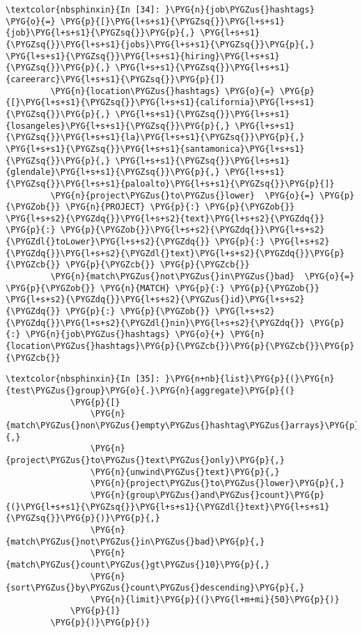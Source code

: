 \documentclass[letterpaper,10pt,english]{sphinxmanual}
\begin{document}
%
\begin{Verbatim}[commandchars=\\\{\}]
\textcolor{nbsphinxin}{In [34]: }\PYG{n}{job\PYGZus{}hashtags}      \PYG{o}{=} \PYG{p}{[}\PYG{l+s+s1}{\PYGZsq{}}\PYG{l+s+s1}{job}\PYG{l+s+s1}{\PYGZsq{}}\PYG{p}{,} \PYG{l+s+s1}{\PYGZsq{}}\PYG{l+s+s1}{jobs}\PYG{l+s+s1}{\PYGZsq{}}\PYG{p}{,} \PYG{l+s+s1}{\PYGZsq{}}\PYG{l+s+s1}{hiring}\PYG{l+s+s1}{\PYGZsq{}}\PYG{p}{,} \PYG{l+s+s1}{\PYGZsq{}}\PYG{l+s+s1}{careerarc}\PYG{l+s+s1}{\PYGZsq{}}\PYG{p}{]}
         \PYG{n}{location\PYGZus{}hashtags} \PYG{o}{=} \PYG{p}{[}\PYG{l+s+s1}{\PYGZsq{}}\PYG{l+s+s1}{california}\PYG{l+s+s1}{\PYGZsq{}}\PYG{p}{,} \PYG{l+s+s1}{\PYGZsq{}}\PYG{l+s+s1}{losangeles}\PYG{l+s+s1}{\PYGZsq{}}\PYG{p}{,} \PYG{l+s+s1}{\PYGZsq{}}\PYG{l+s+s1}{la}\PYG{l+s+s1}{\PYGZsq{}}\PYG{p}{,} \PYG{l+s+s1}{\PYGZsq{}}\PYG{l+s+s1}{santamonica}\PYG{l+s+s1}{\PYGZsq{}}\PYG{p}{,} \PYG{l+s+s1}{\PYGZsq{}}\PYG{l+s+s1}{glendale}\PYG{l+s+s1}{\PYGZsq{}}\PYG{p}{,} \PYG{l+s+s1}{\PYGZsq{}}\PYG{l+s+s1}{paloalto}\PYG{l+s+s1}{\PYGZsq{}}\PYG{p}{]}
         \PYG{n}{project\PYGZus{}to\PYGZus{}lower}  \PYG{o}{=} \PYG{p}{\PYGZob{}} \PYG{n}{PROJECT} \PYG{p}{:} \PYG{p}{\PYGZob{}} \PYG{l+s+s2}{\PYGZdq{}}\PYG{l+s+s2}{text}\PYG{l+s+s2}{\PYGZdq{}} \PYG{p}{:} \PYG{p}{\PYGZob{}}\PYG{l+s+s2}{\PYGZdq{}}\PYG{l+s+s2}{\PYGZdl{}toLower}\PYG{l+s+s2}{\PYGZdq{}} \PYG{p}{:} \PYG{l+s+s2}{\PYGZdq{}}\PYG{l+s+s2}{\PYGZdl{}text}\PYG{l+s+s2}{\PYGZdq{}}\PYG{p}{\PYGZcb{}} \PYG{p}{\PYGZcb{}} \PYG{p}{\PYGZcb{}}
         \PYG{n}{match\PYGZus{}not\PYGZus{}in\PYGZus{}bad}  \PYG{o}{=} \PYG{p}{\PYGZob{}} \PYG{n}{MATCH} \PYG{p}{:} \PYG{p}{\PYGZob{}} \PYG{l+s+s2}{\PYGZdq{}}\PYG{l+s+s2}{\PYGZus{}id}\PYG{l+s+s2}{\PYGZdq{}} \PYG{p}{:} \PYG{p}{\PYGZob{}} \PYG{l+s+s2}{\PYGZdq{}}\PYG{l+s+s2}{\PYGZdl{}nin}\PYG{l+s+s2}{\PYGZdq{}} \PYG{p}{:} \PYG{n}{job\PYGZus{}hashtags} \PYG{o}{+} \PYG{n}{location\PYGZus{}hashtags}\PYG{p}{\PYGZcb{}}\PYG{p}{\PYGZcb{}}\PYG{p}{\PYGZcb{}}
\end{Verbatim}

%
\begin{Verbatim}[commandchars=\\\{\}]
\textcolor{nbsphinxin}{In [35]: }\PYG{n+nb}{list}\PYG{p}{(}\PYG{n}{test\PYGZus{}group}\PYG{o}{.}\PYG{n}{aggregate}\PYG{p}{(}
             \PYG{p}{[}
                 \PYG{n}{match\PYGZus{}non\PYGZus{}empty\PYGZus{}hashtag\PYGZus{}arrays}\PYG{p}{,}
                 \PYG{n}{project\PYGZus{}to\PYGZus{}text\PYGZus{}only}\PYG{p}{,}
                 \PYG{n}{unwind\PYGZus{}text}\PYG{p}{,}
                 \PYG{n}{project\PYGZus{}to\PYGZus{}lower}\PYG{p}{,}
                 \PYG{n}{group\PYGZus{}and\PYGZus{}count}\PYG{p}{(}\PYG{l+s+s1}{\PYGZsq{}}\PYG{l+s+s1}{\PYGZdl{}text}\PYG{l+s+s1}{\PYGZsq{}}\PYG{p}{)}\PYG{p}{,}
                 \PYG{n}{match\PYGZus{}not\PYGZus{}in\PYGZus{}bad}\PYG{p}{,}
                 \PYG{n}{match\PYGZus{}count\PYGZus{}gt\PYGZus{}10}\PYG{p}{,}
                 \PYG{n}{sort\PYGZus{}by\PYGZus{}count\PYGZus{}descending}\PYG{p}{,}
                 \PYG{n}{limit}\PYG{p}{(}\PYG{l+m+mi}{50}\PYG{p}{)}
             \PYG{p}{]}
         \PYG{p}{)}\PYG{p}{)}
\end{Verbatim}
\end{document}
